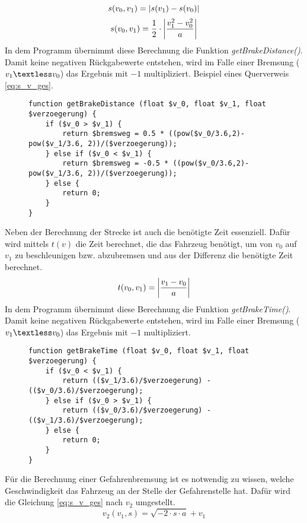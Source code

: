 \begin{equation}
s(v_{0}, v_{1}) = \left\vert s(v_{1}) - s(v_{0})\right\vert 
\end{equation}
\begin{equation}
\label{eq:s_v_ges}
s(v_{0}, v_{1}) =\frac{1}{2} \cdot\left\vert\frac{v_{1}^{2} - v_{0}^{2}}{a}\right\vert
\end{equation}
In dem Programm übernimmt diese Berechnung die Funktion \textit{getBrakeDistance()}. Damit keine negativen Rückgabewerte entstehen, wird im Falle einer Bremsung ($v_{1} \textless v_{0}$) das Ergebnis mit $-1$ multipliziert. Beispiel eines Querverweis \eqref{eq:s_v_ges}.
\begin{figure}
\begin{lstlisting}[caption={\textit{getBrakeDistance$($$)$}},captionpos=b,label={lst:getBrakeDistance}]
function getBrakeDistance (float $v_0, float $v_1, float $verzoegerung) {
	if ($v_0 > $v_1) {
		return $bremsweg = 0.5 * ((pow($v_0/3.6,2)-pow($v_1/3.6, 2))/($verzoegerung));
	} else if ($v_0 < $v_1) {
		return $bremsweg = -0.5 * ((pow($v_0/3.6,2)-pow($v_1/3.6, 2))/($verzoegerung));
	} else {
		return 0;
	}
}
\end{lstlisting}
\end{figure}
Neben der Berechnung der Strecke ist auch die benötigte Zeit essenziell. Dafür wird mittels $t(v)$ die Zeit berechnet, die das Fahrzeug benötigt, um von $v_{0}$ auf $v_{1}$ zu beschleunigen bzw. abzubremsen und aus der Differenz die benötigte Zeit berechnet.
\begin{equation}
\label{eq:t_v_ges}
t(v_{0}, v_{1}) = \left\vert\frac{v_{1} - v_{0}}{a}\right\vert
\end{equation}
In dem Programm übernimmt diese Berechnung die Funktion \textit{getBrakeTime()}. Damit keine negativen Rückgabewerte entstehen, wird im Falle einer Bremsung ($v_{1} \textless v_{0}$) das Ergebnis mit $-1$ multipliziert.
\begin{figure}
\begin{lstlisting}[caption={\textit{getBrakeTime$($$)$}},captionpos=b,label={lst:getBrakeTime}]
function getBrakeTime (float $v_0, float $v_1, float $verzoegerung) {
	if ($v_0 < $v_1) {
		return (($v_1/3.6)/$verzoegerung) - (($v_0/3.6)/$verzoegerung);
	} else if ($v_0 > $v_1) {
		return (($v_0/3.6)/$verzoegerung) - (($v_1/3.6)/$verzoegerung);
	} else {
		return 0;
	}
}
\end{lstlisting}
\end{figure}
Für die Berechnung einer Gefahrenbremsung ist es notwendig zu wissen, welche Geschwindigkeit das Fahrzeug an der Stelle der Gefahrenstelle hat. Dafür wird die Gleichung \eqref{eq:s_v_ges} nach $v_{2}$ umgestellt.
\begin{equation}
\label{eq:gefahrenbremsung}
v_{2}(v_{1}, s) = \sqrt{-2 \cdot s \cdot a} + v_{1}
\end{equation}
